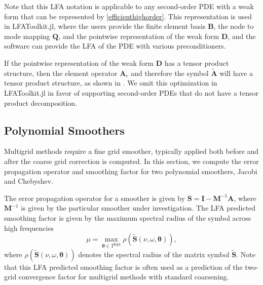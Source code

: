 \documentclass[review]{siamart190516}
\begin{document}
Note that this LFA notation is applicable to any second-order PDE with a weak form that can be represented by \cref{efficienthighorder}.
This representation is used in LFAToolkit.jl, where the users provide the finite element basis $\mathbf{B}$, the node to mode mapping $\mathbf{Q}$, and the pointwise representation of the weak form $\mathbf{D}$, and the software can provide the LFA of the PDE with various preconditioners.

If the pointwise representation of the weak form $\mathbf{D}$ has a tensor product structure, then the element operator $\mathbf{A}_e$ and therefore the symbol $\tilde{\mathbf{A}}$ will have a tensor product structure, as shown in \cite{he2020two}.
We omit this optimization in LFAToolkit.jl in favor of supporting second-order PDEs that do not have a tensor product decomposition.

\subsection{Polynomial Smoothers}\label{sec:smooth}

Multigrid methods require a fine grid smoother, typically applied both before and after the coarse grid correction is computed.
In this section, we compute the error propagation operator and smoothing factor for two polynomial smoothers, Jacobi and Chebyshev.

The error propagation operator for a smoother is given by $\mathbf{S} = \mathbf{I} - \mathbf{M}^{-1} \mathbf{A}$, where $\mathbf{M}^{-1}$ is given by the particular smoother under investigation.
The LFA predicted smoothing factor is given by the maximum spectral radius of the symbol across high frequencies
\begin{equation}
\mu = \max_{\boldsymbol{\theta} \in T^{\text{high}}} \rho \left( \tilde{\mathbf{S}} \left( \nu, \omega, \boldsymbol{\theta} \right) \right),
\end{equation}
where $ \rho \left( \tilde{\mathbf{S}} \left( \nu, \omega, \boldsymbol{\theta} \right)\right)$ denotes the spectral radius of the matrix symbol $\tilde{\mathbf{S}}$.
Note that this LFA predicted smoothing factor is often used as a prediction of the two-grid convergence factor for multigrid methods with standard coarsening.

\end{document}
